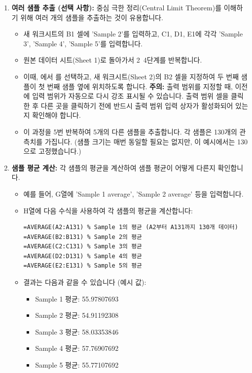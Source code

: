 \documentclass[11pt,a4paper]{article}
\begin{document}
\begin{enumerate}
    \item \textbf{여러 샘플 추출 (선택 사항):}
    중심 극한 정리(Central Limit Theorem)를 이해하기 위해 여러 개의 샘플을 추출하는 것이 유용합니다.
    \begin{itemize}
        \item 새 워크시트의 B1 셀에 'Sample 2'를 입력하고, C1, D1, E1에 각각 'Sample 3', 'Sample 4', 'Sample 5'를 입력합니다.
        \item 원본 데이터 시트(Sheet 1)로 돌아가서 2~4단계를 반복합니다.
        \item 이때, 에서 를 선택하고, 새 워크시트(Sheet 2)의 B2 셀을 지정하여 두 번째 샘플이 첫 번째 샘플 옆에 위치하도록 합니다. \textbf{주의:} 출력 범위를 지정할 때, 이전에 입력 범위가 자동으로 다시 강조 표시될 수 있습니다. 출력 범위 셀을 클릭한 후 다른 곳을 클릭하기 전에 반드시 출력 범위 입력 상자가 활성화되어 있는지 확인해야 합니다.
        \item 이 과정을 5번 반복하여 5개의 다른 샘플을 추출합니다. 각 샘플은 130개의 관측치를 가집니다. (샘플 크기는 매번 동일할 필요는 없지만, 이 예시에서는 130으로 고정했습니다.)
    \end{itemize}

    \item \textbf{샘플 평균 계산:}
    각 샘플의 평균을 계산하여 샘플 평균이 어떻게 다른지 확인합니다.
    \begin{itemize}
        \item 예를 들어, G열에 'Sample 1 average', 'Sample 2 average' 등을 입력합니다.
        \item H열에 다음 수식을 사용하여 각 샘플의 평균을 계산합니다:
        \begin{lstlisting}[language=Excel, caption={샘플 평균 계산 예시}, label={lst:sample_avg}]
=AVERAGE(A2:A131) % Sample 1의 평균 (A2부터 A131까지 130개 데이터)
=AVERAGE(B2:B131) % Sample 2의 평균
=AVERAGE(C2:C131) % Sample 3의 평균
=AVERAGE(D2:D131) % Sample 4의 평균
=AVERAGE(E2:E131) % Sample 5의 평균
        \end{lstlisting}
        \item 결과는 다음과 같을 수 있습니다 (예시 값):
        \begin{itemize}
            \item Sample 1 평균: 55.97807693
            \item Sample 2 평균: 54.91192308
            \item Sample 3 평균: 58.03353846
            \item Sample 4 평균: 57.76907692
            \item Sample 5 평균: 55.77107692
        \end{itemize}
    \end{itemize}
\end{enumerate}
\end{document}
